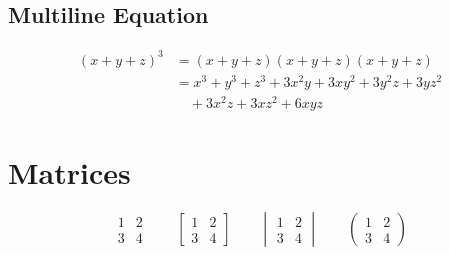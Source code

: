 \documentclass[12pt,a4paper]{article}
\begin{document}
\subsection{Multiline Equation}
\begin{align*}
(x+y+z)^3
&=(x+y+z)(x+y+z)(x+y+z)\\
&=x^3+y^3+z^3
  +3x^2y+3xy^2+3y^2z+3yz^2\\
&\quad+3x^2z+3xz^2+6xyz
\end{align*}

\section{Matrices}
\[
\begin{matrix}
1&2\\
3&4
\end{matrix}
\qquad
\begin{bmatrix}
1&2\\
3&4
\end{bmatrix}
\qquad
\begin{vmatrix}
1&2\\
3&4
\end{vmatrix}
\qquad
\begin{pmatrix}
1&2\\
3&4
\end{pmatrix}
\]
\end{document}
